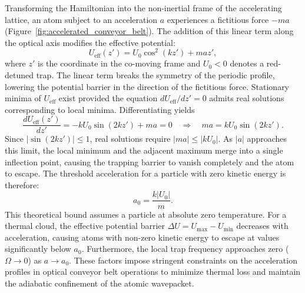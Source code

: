 Transforming the Hamiltonian into the non-inertial frame of the accelerating lattice, an atom subject to an acceleration $a$ experiences a fictitious force $-ma$ (Figure~\ref{fig:accelerated_conveyor_belt}). The addition of this linear term along the optical axis modifies the effective potential:
\begin{equation}
U_{\text{eff}}(z') = U_0 \cos^2(kz') + m a z',
\label{eq:tilted_potential}
\end{equation}
where $z'$ is the coordinate in the co-moving frame and $U_0 < 0$ denotes a red-detuned trap. The linear term breaks the symmetry of the periodic profile, lowering the potential barrier in the direction of the fictitious force. Stationary minima of $U_{\text{eff}}$ exist provided the equation $dU_{\text{eff}}/dz' = 0$ admits real solutions corresponding to local minima. Differentiating yields
\begin{equation}
\frac{d U_{\text{eff}}(z')}{dz'} = -k U_0 \sin(2kz') + m a = 0 \quad \Longrightarrow \quad m a = k U_0 \sin(2kz').
\label{eq:potential_derivative}
\end{equation}
Since $|\sin(2kz')| \leq 1$, real solutions require $|ma| \leq |kU_0|$. As $|a|$ approaches this limit, the local minimum and the adjacent maximum merge into a single inflection point, causing the trapping barrier to vanish completely and the atom to escape. The threshold acceleration for a particle with zero kinetic energy is therefore:
\begin{equation}
a_0 = \frac{k |U_0|}{m}.
\label{eq:max_acceleration}
\end{equation}
This theoretical bound assumes a particle at absolute zero temperature. For a thermal cloud, the effective potential barrier $\Delta U = U_{\max} - U_{\min}$ decreases with acceleration, causing atoms with non-zero kinetic energy to escape at values significantly below $a_0$. Furthermore, the local trap frequency approaches zero ($\Omega \to 0$) as $a \to a_0$. These factors impose stringent constraints on the acceleration profiles in optical conveyor belt operations to minimize thermal loss and maintain the adiabatic confinement of the atomic wavepacket.